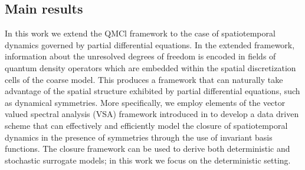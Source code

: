 \documentclass[letterpaper,10pt,3p,preprint]{elsarticle}
\begin{document}
\subsection{Main results}\label{sec:main-results}
In this work we extend the QMCl framework to the case of spatiotemporal
dynamics governed by partial differential equations.
In the extended framework, information about the unresolved degrees
of freedom is encoded in fields of quantum density operators
which are embedded within the spatial discretization cells of the
coarse model.
This produces a framework that can naturally take advantage of the
spatial structure exhibited by partial differential equations,
such as dynamical symmetries.
More specifically, we employ elements of the
vector valued spectral analysis (VSA) framework introduced in
\cite{Giannakis2019vsa}
to develop a data driven scheme that can effectively and efficiently
model the closure of spatiotemporal dynamics in the presence of
symmetries through the use of invariant basis functions.
The closure framework can be used to derive both deterministic and
stochastic surrogate models; in this work we focus on the
deterministic setting.
\end{document}
